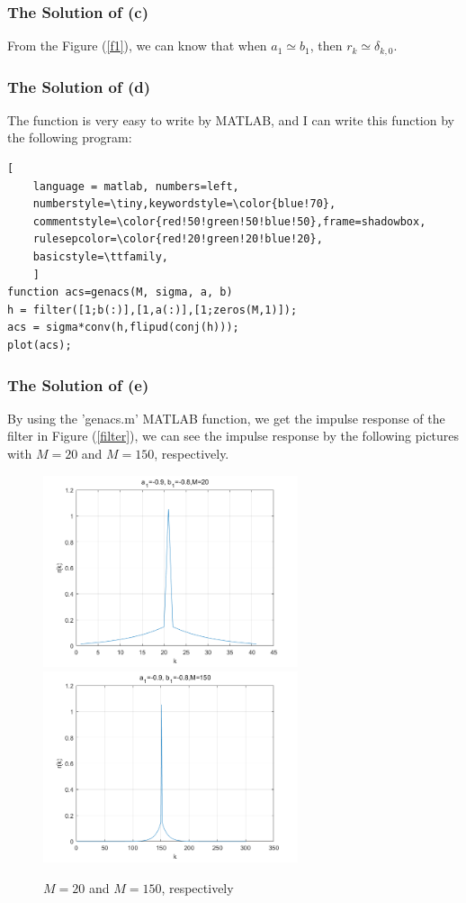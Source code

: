 \documentclass[UTF-8, a4paper, 12pt]{ctexart}
\begin{document}
\newpage
\subsubsection{The Solution of (c)}

From the Figure (\ref{f1}), we can know that when $a_1\simeq b_1$, then $r_k\simeq\delta_{k,0}$.

\subsubsection{The Solution of (d)}

The function is very easy to write by MATLAB, and I can write this function by the following program:
\begin{lstlisting}[
	language = matlab, numbers=left, 
	numberstyle=\tiny,keywordstyle=\color{blue!70},
	commentstyle=\color{red!50!green!50!blue!50},frame=shadowbox,
	rulesepcolor=\color{red!20!green!20!blue!20},
	basicstyle=\ttfamily,
	]
function acs=genacs(M, sigma, a, b)
h = filter([1;b(:)],[1,a(:)],[1;zeros(M,1)]);
acs = sigma*conv(h,flipud(conj(h)));
plot(acs);
\end{lstlisting}

\subsubsection{The Solution of (e)}

By using the 'genacs.m' MATLAB function, we get the impulse response of the filter in Figure (\ref{filter}), we can see the impulse response by the following pictures with $M=20$ and $M=150$, respectively.
\begin{figure}
    \centering
    \includegraphics[width=7.5cm]{1/e1.png}
    \includegraphics[width=7.5cm]{1/e2.png}
    \caption{$M=20$ and $M=150$, respectively}
\end{figure}
\end{document}
